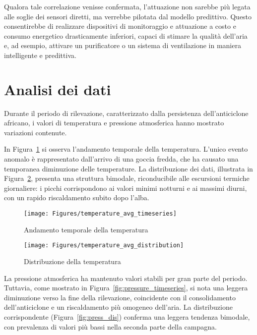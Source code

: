\documentclass[fleqn,10pt]{SelfArx} %
\begin{document}
Qualora tale correlazione venisse confermata, l'attuazione non sarebbe più legata alle soglie dei sensori diretti, ma verrebbe pilotata dal modello predittivo. Questo consentirebbe di realizzare dispositivi di monitoraggio e attuazione a costo e consumo energetico drasticamente inferiori, capaci di stimare la qualità dell'aria e, ad esempio, attivare un purificatore o un sistema di ventilazione in maniera intelligente e predittiva.




\section{Analisi dei dati}

Durante il periodo di rilevazione, caratterizzato dalla persistenza dell’anticiclone africano, i valori di temperatura e pressione atmosferica hanno mostrato variazioni contenute.

In Figura~\ref{fig:temperature_timeseries} si osserva l’andamento temporale della temperatura. L’unico evento anomalo è rappresentato dall’arrivo di una goccia fredda, che ha causato una temporanea diminuzione delle temperature. La distribuzione dei dati, illustrata in Figura~\ref{fig:temperature_dis}, presenta una struttura bimodale, riconducibile alle escursioni termiche giornaliere: i picchi corrispondono ai valori minimi notturni e ai massimi diurni, con un rapido riscaldamento subito dopo l’alba.

\begin{figure}[ht]\centering
	\texttt{[image: Figures/temperature\_avg\_timeseries]}
	\caption{Andamento temporale della temperatura}
	\label{fig:temperature_timeseries}
\end{figure}

\begin{figure}[ht]\centering
	\texttt{[image: Figures/temperature\_avg\_distribution]}
	\caption{Distribuzione della temperatura}
	\label{fig:temperature_dis}
\end{figure}

La pressione atmosferica ha mantenuto valori stabili per gran parte del periodo. Tuttavia, come mostrato in Figura~\ref{fig:pressure_timeseries}, si nota una leggera diminuzione verso la fine della rilevazione, coincidente con il consolidamento dell’anticiclone e un riscaldamento più omogeneo dell’aria. La distribuzione corrispondente (Figura~\ref{fig:press_dis}) conferma una leggera tendenza bimodale, con prevalenza di valori più bassi nella seconda parte della campagna.
\end{document}

